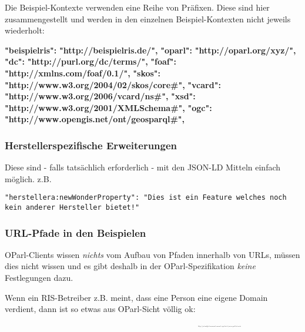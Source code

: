 \documentclass[,a4paper]{article}
\newenvironment{Shaded}{}{}
\newcommand{\ErrorTok}[1]{\textcolor[rgb]{1.00,0.00,0.00}{\textbf{{#1}}}}
\begin{document}
Die Beispiel-Kontexte verwenden eine Reihe von Präfixen. Diese sind hier
zusammengestellt und werden in den einzelnen Beispiel-Kontexten nicht
jeweils wiederholt:

\begin{Shaded}
\begin{Highlighting}[]
    \ErrorTok{"beispielris":} \ErrorTok{"http://beispielris.de/",}
    \ErrorTok{"oparl":} \ErrorTok{"http://oparl.org/xyz/",}
    \ErrorTok{"dc":} \ErrorTok{"http://purl.org/dc/terms/",}
    \ErrorTok{"foaf":} \ErrorTok{"http://xmlns.com/foaf/0.1/",}
    \ErrorTok{"skos":} \ErrorTok{"http://www.w3.org/2004/02/skos/core#",}
    \ErrorTok{"vcard":} \ErrorTok{"http://www.w3.org/2006/vcard/ns#",}
    \ErrorTok{"xsd":} \ErrorTok{"http://www.w3.org/2001/XMLSchema#",}
    \ErrorTok{"ogc":} \ErrorTok{"http://www.opengis.net/ont/geosparql#",}
\end{Highlighting}
\end{Shaded}

\subsubsection{Herstellerspezifische
Erweiterungen}\label{herstellerspezifische-erweiterungen}

Diese sind - falls tatsächlich erforderlich - mit den JSON-LD Mitteln
einfach möglich. z.B.

\begin{verbatim}
"herstellera:newWonderProperty": "Dies ist ein Feature welches noch kein anderer Hersteller bietet!"
\end{verbatim}

\subsubsection{URL-Pfade in den
Beispielen}\label{url-pfade-in-den-beispielen}

OParl-Clients wissen \emph{nichts} vom Aufbau von Pfaden innerhalb von
URLs, müssen dies nicht wissen und es gibt deshalb in der
OParl-Spezifikation \emph{keine} Festlegungen dazu.

Wenn ein RIS-Betreiber z.B. meint, dass eine Person eine eigene Domain
verdient, dann ist so etwas aus OParl-Sicht völlig ok:
\textsubscript{\textsubscript{\textsubscript{\textsubscript{\textsubscript{\textsubscript{\textsubscript{\textsubscript{\textsubscript{\textsubscript{
https://ratsmitglied-max-mustermann.beispielris.de/mein-oparl-datensatz
}}}}}}}}}}
\end{document}
